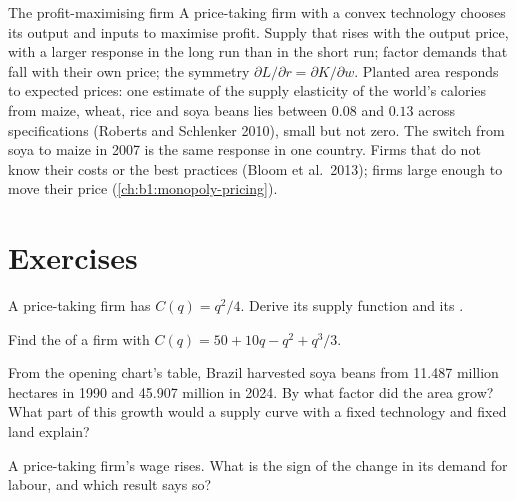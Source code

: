 \begin{model}{The profit-maximising firm}
\assumes A price-taking firm with a convex technology chooses its output
and inputs to maximise profit.
\predicts Supply that rises with the output price, with a larger response
in the long run than in the short run; factor demands that fall with their
own price; the symmetry $\partial L/\partial r = \partial K/\partial w$.
\tested Planted area responds to expected prices: one estimate of the
supply elasticity of the world's calories from maize, wheat, rice and soya
beans lies between $0.08$ and $0.13$ across specifications (Roberts and
Schlenker 2010), small but not zero. %
The switch from soya to maize in 2007 is the same response in one
country. %
\breaks Firms that do not know their costs or the best practices
(Bloom et al.\ 2013); %
firms large enough to move their price (\cref{ch:b1:monopoly-pricing}).
\end{model}

\section*{Exercises}\label{sec:b1:profit-maximisation:exercises}

\begin{exercise}[$\star$]\label{exo:b1:profit-maximisation:supply-q2}
A price-taking firm has $C(q) = q^2/4$. Derive its supply function and its
.
\end{exercise}

\begin{exercise}[$\star$]\label{exo:b1:profit-maximisation:shutdown}
Find the  of a firm with
$C(q) = 50 + 10q - q^2 + q^3/3$.
\end{exercise}

\begin{exercise}[$\star$]\label{exo:b1:profit-maximisation:read}
From the opening chart's table, Brazil harvested soya beans from 11.487
million hectares in 1990 and 45.907 million in 2024. %
By what factor did the area grow? What part of this growth would a supply
curve with a fixed technology and fixed land explain?
\end{exercise}

\begin{exercise}[$\star$]\label{exo:b1:profit-maximisation:sign}
A price-taking firm's wage rises. What is the sign of the change in its
demand for labour, and which result says so?
\end{exercise}

